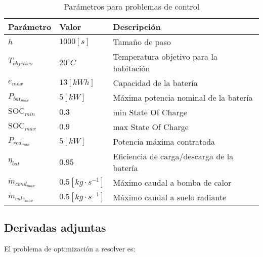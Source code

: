 \begin{table}[ht]
	\centering
	\label{tab:control_data}
	\caption{Parámetros para problemas de control}
	\begin{tabular}{@{}lll@{}}
		\toprule
		\textbf{Parámetro}     & \textbf{Valor}         & \textbf{Descripción}                       \\
		\midrule
		$h$                    & $1000[s]$              & Tamaño de paso                             \\
		$T_{objetivo}$         & $20 ^\circ C$          & Temperatura objetivo para la habitación    \\
		$e_{max}$              & $13[kWh]$              & Capacidad de la batería                    \\
		$P_{bat_{max}}$        & $5[kW]$                & Máxima potencia nominal de la batería      \\
		$\text{SOC}_{min}$     & $0.3$                  & min State Of Charge                        \\
		$\text{SOC}_{max}$     & $0.9$                  & max State Of Charge                        \\
		$P_{red_{max}}$        & $5[kW]$                & Potencia máxima contratada                 \\
		$\eta_{bat}$           & $0.95$                 & Eficiencia de carga/descarga de la batería \\
		$\dot{m}_{cond_{max}}$ & $0.5[kg \cdot s^{-1}]$ & Máximo caudal a bomba de calor             \\
		$\dot{m}_{cale_{max}}$ & $0.5[kg \cdot s^{-1}]$ & Máximo caudal a suelo radiante             \\
		\bottomrule
	\end{tabular}
\end{table}


\subsection{Derivadas adjuntas}

El problema de optimización a resolver es:

